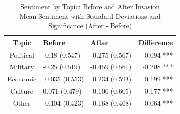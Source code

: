 \begin{table}[!t]
\caption*{
{\large Sentiment by Topic: Before and After Invasion} \\ 
{\small Mean Sentiment with Standard Deviations and Significance (After - Before)}
} 
\fontsize{12.0pt}{14.4pt}\selectfont
\begin{tabular*}{\linewidth}{@{\extracolsep{\fill}}cllr}
\toprule
Topic & Before & After & Difference \\ 
\midrule\addlinespace[2.5pt]
Political & {-0.18
(0.547)} & {-0.275
(0.567)} & {-0.094 ***} \\ 
Military & {-0.25
(0.519)} & {-0.459
(0.561)} & {-0.208 ***} \\ 
Economic & {-0.035
(0.553)} & {-0.234
(0.593)} & {-0.199 ***} \\ 
Culture & {0.071
(0.479)} & {-0.106
(0.605)} & {-0.177 ***} \\ 
Other & {-0.104
(0.423)} & {-0.168
(0.468)} & {-0.064 ***} \\ 
\bottomrule
\end{tabular*}
\end{table}

